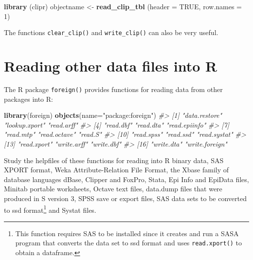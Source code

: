 \documentclass[
]{book}
\newenvironment{Shaded}{\begin{snugshade}}{\end{snugshade}}
\newcommand{\AttributeTok}[1]{\textcolor[rgb]{0.13,0.29,0.53}{#1}}
\newcommand{\CommentTok}[1]{\textcolor[rgb]{0.56,0.35,0.01}{\textit{#1}}}
\newcommand{\ConstantTok}[1]{\textcolor[rgb]{0.56,0.35,0.01}{#1}}
\newcommand{\DecValTok}[1]{\textcolor[rgb]{0.00,0.00,0.81}{#1}}
\newcommand{\FunctionTok}[1]{\textcolor[rgb]{0.13,0.29,0.53}{\textbf{#1}}}
\newcommand{\NormalTok}[1]{#1}
\newcommand{\OtherTok}[1]{\textcolor[rgb]{0.56,0.35,0.01}{#1}}
\newcommand{\StringTok}[1]{\textcolor[rgb]{0.31,0.60,0.02}{#1}}
\begin{document}
\begin{Shaded}
\begin{Highlighting}[]
\FunctionTok{library}\NormalTok{ (clipr)}
\NormalTok{objectname }\OtherTok{\textless{}{-}} \FunctionTok{read\_clip\_tbl}\NormalTok{ (}\AttributeTok{header =} \ConstantTok{TRUE}\NormalTok{, }\AttributeTok{row.names =} \DecValTok{1}\NormalTok{)}
\end{Highlighting}
\end{Shaded}

The functions \texttt{clear\_clip()} and \texttt{write\_clip()} can also be very useful.

\section{Reading other data files into R}\label{reading-other-data-files-into-r}

The R package \texttt{foreign()} provides functions for reading data from other packages into R:

\begin{Shaded}
\begin{Highlighting}[]
\FunctionTok{library}\NormalTok{(foreign)}
\FunctionTok{objects}\NormalTok{(}\AttributeTok{name=}\StringTok{"package:foreign"}\NormalTok{)}
\CommentTok{\#\textgreater{}  [1] "data.restore"  "lookup.xport"  "read.arff"    }
\CommentTok{\#\textgreater{}  [4] "read.dbf"      "read.dta"      "read.epiinfo" }
\CommentTok{\#\textgreater{}  [7] "read.mtp"      "read.octave"   "read.S"       }
\CommentTok{\#\textgreater{} [10] "read.spss"     "read.ssd"      "read.systat"  }
\CommentTok{\#\textgreater{} [13] "read.xport"    "write.arff"    "write.dbf"    }
\CommentTok{\#\textgreater{} [16] "write.dta"     "write.foreign"}
\end{Highlighting}
\end{Shaded}

Study the helpfiles of these functions for reading into R binary data, SAS XPORT format, Weka Attribute-Relation File Format, the Xbase family of database languages dBase, Clipper and FoxPro, Stata, Epi Info and EpiData files, Minitab portable worksheets, Octave text files, data.dump files that were produced in S version 3, SPSS save or export files, SAS data sets to be converted to ssd format\footnote{This function requires SAS to be installed since it creates and run a SASA program that converts the data set to ssd format and uses \texttt{read.xport()} to obtain a dataframe.} and Systat files.
\end{document}
